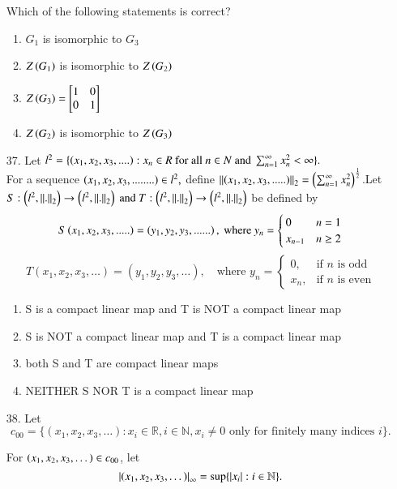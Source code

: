 \documentclass[journal]{IEEEtran}
\begin{document}
\begin{enumerate}
    Which of the following statements is correct?    
    \begin{enumerate}[label=(\Alph*)]
        \item $G_1$ is isomorphic to $G_3$
        \item $Z\left(G_1\right)$ is isomorphic to $Z\left(G_2\right)$
        \item $Z\left(G_3\right) = \begin{bmatrix}1&0\\0&1\end{bmatrix}$
        \item $Z\left(G_2\right)$ is isomorphic to $Z\left(G_3\right)$
    \end{enumerate}
    \item[37.] Let $l^2 = \{\left(x_1, x_2, x_3,....\right): x_n \in R \text{ for all }n\in N \text{ and }\sum_{n=1}^{\infty}x_n^2 <\infty\}.$\\ For a sequence $\left(x_1, x_2, x_3, ........\right)\in l^2,$ define $\left\lVert\left(x_1,x_2,x_3,.....\right)\right\rVert_2 = \left(\sum_{n=1}^{\infty}x_n^2\right)^\frac{1}{2}$.Let $S:\left(l^2, \left\lVert.\right\rVert_2\right)\to \left(l^2, \left\lVert.\right\rVert_2\right) \text{ and }T:\left(l^2, \left\lVert.\right\rVert_2\right)\to \left(l^2, \left\lVert.\right\rVert_2\right)$ be defined by $$S\left(x_1, x_2, x_3,.....\right)=\left(y_1,y_2,y_3,......\right), \text{ where  } y_n = \begin{cases}0 & n=1\\x_{n-1}&n\geq 2\end{cases}$$  $$T(x_1, x_2, x_3, \dots) = (y_1, y_2, y_3, \dots), \quad \text{where } y_n = \begin{cases} 0, & \text{if } n \text{ is odd} \\x_n, & \text{if } n \text{ is even}\end{cases}$$
    \begin{enumerate}[label=(\Alph*)]
        \item S is a compact linear map and T is NOT a compact linear map
        \item S is NOT a compact linear map and T is a compact linear map
        \item both S and T are compact linear maps
        \item NEITHER S NOR T is a compact linear map
    \end{enumerate}
    \item[38.] Let $$
c_{00} = \{(x_1, x_2, x_3, \dots) : x_i \in \mathbb{R}, i \in \mathbb{N}, x_i \neq 0 \text{ only for finitely many indices } i\}.$$

For $\left(x_1, x_2, x_3, \dots\right) \in c_{00}$, let
$$
\left\vert\left(x_1, x_2, x_3, \dots\right)\right\vert_{\infty} = \sup \{ \left\vert x_i\right\vert : i \in \mathbb{N} \}.
$$


\end{enumerate}
\end{document}
